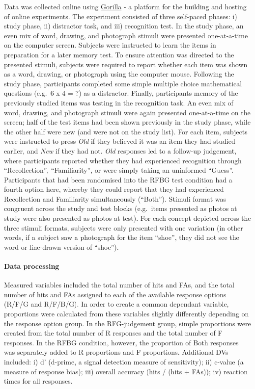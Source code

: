 \documentclass[
  11pt,
]{article}
\begin{document}
Data was collected online using \href{https://gorilla.sc/}{Gorilla} - a
platform for the building and hosting of online experiments. The
experiment consisted of three self-paced phases: i) study phase, ii)
distractor task, and iii) recognition test. In the study phase, an even
mix of word, drawing, and photograph stimuli were presented
one-at-a-time on the computer screen. Subjects were instructed to learn
the items in preparation for a later memory test. To ensure attention
was directed to the presented stimuli, subjects were required to report
whether each item was shown as a word, drawing, or photograph using the
computer mouse. Following the study phase, participants completed some
simple multiple choice mathematical questions (e.g.~6 x 4 = ?) as a
distractor. Finally, participants memory of the previously studied items
was testing in the recognition task. An even mix of word, drawing, and
photograph stimuli were again presented one-at-a-time on the screen;
half of the test items had been shown previously in the study phase,
while the other half were new (and were not on the study list). For each
item, subjects were instructed to press \emph{Old} if they believed it
was an item they had studied earlier, and \emph{New} if they had not.
\emph{Old} responses led to a follow-up judgement, where participants
reported whether they had experienced recognition through
``Recollection'', ``Familiarity'', or were simply taking an uninformed
``Guess''. Participants that had been randomised into the RFBG test
condition had a fourth option here, whereby they could report that they
had experienced Recollection and Familiarity simultaneously (``Both'').
Stimuli format was congruent across the study and test blocks
(e.g.~items presented as photos at study were also presented as photos
at test). For each concept depicted across the three stimuli formats,
subjects were only presented with one variation (in other words, if a
subject saw a photograph for the item ``shoe'', they did not see the
word or line-drawn version of ``shoe'').

\hypertarget{data-processing-2}{%
\paragraph{Data processing}\label{data-processing-2}}

Measured variables included the total number of hits and FAs, and the
total number of hits and FAs assigned to each of the available response
options (R/F/G and R/F/B/G). In order to create a common dependant
variable, proportions were calculated from these variables slightly
differently depending on the response option group. In the RFG-judgement
group, simple proportions were created from the total number of R
responses and the total number of F responses. In the RFBG condition,
however, the proportion of Both responses was separately added to R
proportions and F proportions. Additional DVs included: i) d' (d-prime,
a signal detection measure of sensitivity); ii) c-value (a measure of
response bias); iii) overall accuracy (hits / (hits + FAs)); iv)
reaction times for all responses.
\end{document}
